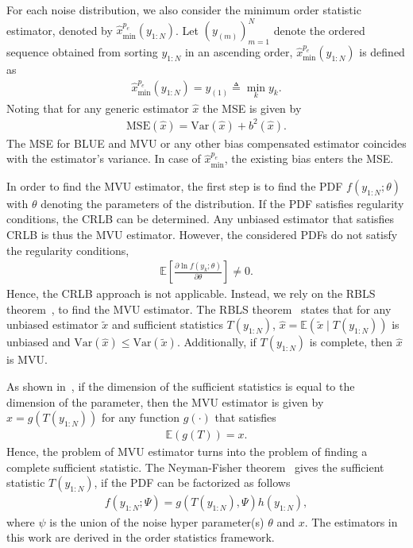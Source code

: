 \documentclass{article}
\newcommand{\E}{\mathbb{E}}
\newcommand{\Var}{\mathrm{Var}}
\newcommand{\MSE}{\mathrm{MSE}}
\begin{document}
For each noise distribution, we also consider the minimum order statistic estimator, denoted by $\hat{x}^{p_e}_{\mathrm{min}}(y_{1:N})$. Let $\left(y_{(m)}\right)_{m=1}^{N}$ denote the ordered sequence obtained from sorting $y_{1:N}$ in an ascending order, $\hat{x}^{p_e}_{\mathrm{min}}(y_{1:N})$ is defined as
%
%
\begin{align}
	\hat{x}^{p_e}_{\mathrm{min}}(y_{1:N}) = y_{(1)} \triangleq \min_{k} y_k.
\end{align}
%
%
Noting that for any generic estimator $\hat{x}$ the MSE is given by
%
%
\begin{align}\label{eq:mse_generic}
\MSE(\hat{x}) = \Var(\hat{x}) + b^2(\hat{x}).
\end{align}
%
%
The MSE for BLUE and MVU or any other bias compensated estimator coincides with the estimator's variance. In case of $\hat{x}^{p_e}_{\mathrm{min}}$, the existing bias enters the MSE.

In order to find the MVU estimator, the first step is to find the PDF $f(y_{1:N};\theta)$ with $\theta$ denoting the parameters of the distribution. If the PDF satisfies regularity conditions, the CRLB can be determined. Any unbiased estimator that satisfies CRLB is thus the MVU estimator. However, the considered PDFs do not satisfy the regularity conditions,
%
%
\begin{align}
\E\left[\frac{\partial\ln f(y_k;\theta)}{\partial \theta}\right]\neq0.
\end{align}
%
%
Hence, the CRLB approach is not applicable. Instead, we rely on the RBLS theorem~\citep{article:IJS_lehmann_1,article:IJS_lehmann_2,book:ET_kay_93}, to find the MVU estimator. The RBLS theorem~\citep{article:IJS_lehmann_1} states that for any unbiased estimator $\tilde{x}$ and sufficient statistics $T(y_{1:N})$, $\hat{x}=\E(\tilde{x}\mid T(y_{1:N}))$ is unbiased and $\Var(\hat{x})\leq\Var(\tilde{x})$. Additionally, if $T(y_{1:N})$ is complete, then $\hat{x}$ is MVU.

As shown in~\citep{book:ET_kay_93}, if the dimension of the sufficient statistics is equal to the dimension of the parameter, then the MVU estimator is given by $\hat{x}=g(T(y_{1:N}))$ for any function $g(\cdot)$ that satisfies
%
%
\begin{align}
\E(g(T)) = x.
\end{align}
%
%
Hence, the problem of MVU estimator turns into the problem of finding a complete sufficient statistic. The Neyman-Fisher theorem~\citep{article:fisher_22,article:AMS_halmos_49} gives the sufficient statistic $T(y_{1:N})$, if the PDF can be factorized as follows
%
%
\begin{align}
f(y_{1:N};\Psi) =g(T(y_{1:N}),\Psi)h(y_{1:N}),
\end{align}
%
%
where $\psi$ is the union of the noise hyper parameter(s) $\theta$ and $x$. The estimators in this work are derived in the order statistics framework. 
%
%
\end{document}
